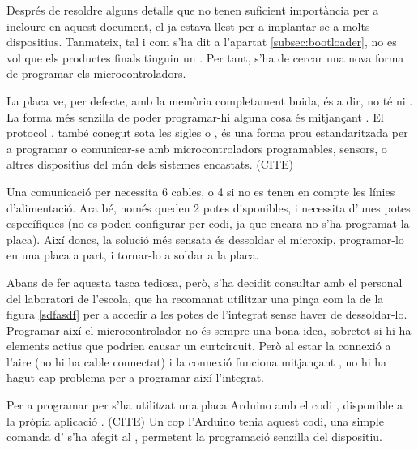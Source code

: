 Després de resoldre alguns detalls que no tenen suficient importància per a
incloure en aquest document, el  ja estava llest per a 
implantar-se a molts dispositius. Tanmateix, tal i com s'ha dit a
l'apartat \ref{subsec:bootloader}, no es vol que els productes finals tinguin
un . Per tant, s'ha de cercar una nova forma de programar
els microcontroladors.

La placa  ve, per defecte, amb la memòria  completament
buida, és a dir, no té ni . La forma més senzilla de poder
programar-hi alguna cosa és mitjançant . El protocol
, també conegut sota les sigles  o
, és una forma prou estandaritzada per a
programar o comunicar-se amb microcontroladors programables, sensors, o altres
dispositius del món dels sistemes encastats. (CITE)

Una comunicació per  necessita 6 cables, o 4 si no es tenen en compte
les línies d'alimentació. Ara bé, només queden 2 potes disponibles, i 
necessita d'unes potes específiques (no es poden configurar per codi, ja que
encara no s'ha programat la placa). Així doncs, la solució més sensata és
dessoldar el microxip, programar-lo en una placa a part, i tornar-lo a soldar
a la placa.

Abans de fer aquesta tasca tediosa, però, s'ha decidit consultar amb el
personal del laboratori de l'escola, que ha recomanat utilitzar una pinça com
la de la figura \ref{sdfasdf} per a accedir a les potes de l'integrat sense haver
de dessoldar-lo. Programar així el microcontrolador no és sempre una bona idea,
sobretot si hi ha elements actius que podrien causar un curtcircuit. Però al estar
la connexió  a l'aire (no hi ha cable connectat) i la connexió
 funciona mitjançant , no hi ha hagut cap problema per
a programar així l'integrat.

Per a programar per  s'ha utilitzat una placa Arduino amb el codi
, disponible a la pròpia aplicació . (CITE) Un cop
l'Arduino tenia aquest codi, una simple comanda d' s'ha afegit
al , permetent la programació senzilla del dispositiu.
